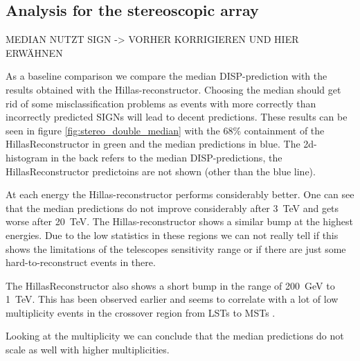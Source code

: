 \subsection{Analysis for the stereoscopic array}
MEDIAN NUTZT SIGN -> VORHER KORRIGIEREN UND HIER ERWÄHNEN

As a baseline comparison we compare the median DISP-prediction 
with the results obtained with the Hillas-reconstructor.
Choosing the median should get rid of some misclassification 
problems as events with more correctly than incorrectly 
predicted SIGNs will lead to decent predictions.
These results can be seen in figure \ref{fig:stereo_double_median}
with the 68\% containment of the HillasReconstructor in green 
and the median predictions in blue.
The 2d-histogram in the back refers to the median DISP-predictions,
the HillasReconstructor predictoins are not shown (other than the blue line).

At each energy the Hillas-reconstructor performs considerably better.
One can see that the median predictions do not improve considerably after
\SI{3}{\tera\electronvolt} and gets worse after \SI{20}{\tera\electronvolt}.
The Hillas-reconstructor shows a similar bump at the highest energies.
Due to the low statistics in these regions we can not really tell 
if this shows the limitations of the telescopes sensitivity range 
or if there are just some hard-to-reconstruct events in there. 

The HillasReconstructor also shows a short bump in the range of \SI{200}{\giga\electronvolt}
to \SI{1}{\tera\electronvolt}. 
This has been observed earlier and seems to correlate with 
a lot of low multiplicity events in the crossover region from LSTs to MSTs \cite{????}.

Looking at the multiplicity we can conclude that the median predictions
do not scale as well with higher multiplicities.

